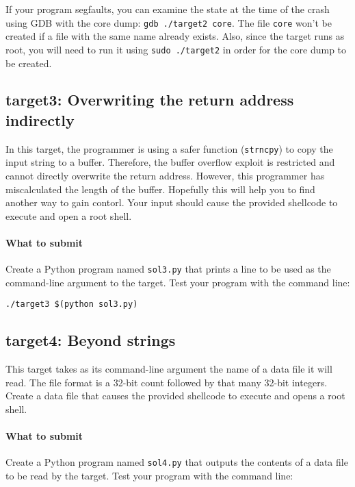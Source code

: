 \documentclass[letterpaper,12pt]{report}
\begin{document}
{\medskip

If your program segfaults, you can examine the state at the time of the crash using GDB with the core dump: \texttt{gdb ./target2 core}.  The file \texttt{core} won't be created if a file with the same name already exists.  Also, since the target runs as root, you will need to run it using \texttt{sudo ./target2} in order for the core dump to be created.

\subsection*{target3: Overwriting the return address indirectly }
\label{sec:target3}

In this target, the programmer is using a safer function (\texttt{strncpy}) to copy the input string to a buffer. Therefore, the buffer overflow exploit is restricted and cannot directly overwrite the return address.   However, this programmer has miscalculated the length of the buffer. Hopefully this will help you to find another way to gain contorl.  Your input should cause the provided shellcode to execute and open a root shell.

\paragraph{What to submit}
Create a Python program named \texttt{sol3.py} that prints a line to be used as the command-line argument to the target.  Test your program with the command line:

\smallskip

\quad\texttt{./target3 \$(python sol3.py)}

\subsection*{target4: Beyond strings}
\label{sec:target4}

This target takes as its command-line argument the name of a data file it will read.  The file format is a 32-bit count followed by that many 32-bit integers.  Create a data file that causes the provided shellcode to execute and opens a root shell.

\paragraph{What to submit}
Create a Python program named \texttt{sol4.py} that outputs the contents of a data file to be read by the target.  Test your program with the command line:

}
\end{document}
